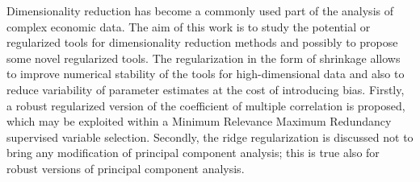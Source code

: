
\begin{Abstrakt}
    Dimensionality reduction has become a commonly used part of the analysis of complex economic data. The aim of this work is to study the potential or regularized tools for dimensionality reduction methods and possibly to propose some novel regularized tools. The regularization in the form of shrinkage allows to improve numerical stability of the tools for high-dimensional data and also to reduce variability of parameter estimates at the cost of introducing bias. Firstly, a robust regularized version of the coefficient of multiple correlation is proposed, which may be exploited within a Minimum Relevance Maximum Redundancy supervised variable selection. Secondly, the ridge regularization is discussed not to bring any modification of principal component analysis; this is true also for robust versions of principal component analysis.
\end{Abstrakt}



\clearpage